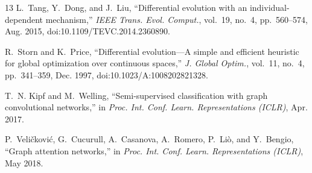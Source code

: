 \documentclass[conference]{IEEEtran}
\begin{document}
\begin{thebibliography}{13}
L.~Tang, Y.~Dong, and J.~Liu,
``Differential evolution with an individual-dependent mechanism,''
\emph{IEEE Trans. Evol. Comput.}, vol.~19, no.~4, pp.~560--574, Aug. 2015, doi:10.1109/TEVC.2014.2360890.

R.~Storn and K.~Price,
``Differential evolution---A simple and efficient heuristic for global optimization over continuous spaces,''
\emph{J. Global Optim.}, vol.~11, no.~4, pp.~341--359, Dec. 1997, doi:10.1023/A:1008202821328.

T.~N. Kipf and M.~Welling,
``Semi-supervised classification with graph convolutional networks,''
in \emph{Proc. Int. Conf. Learn. Representations (ICLR)}, Apr. 2017.

P.~Veli\v{c}kovi\'{c}, G.~Cucurull, A.~Casanova, A.~Romero, P.~Li\`{o}, and Y.~Bengio,
``Graph attention networks,''
in \emph{Proc. Int. Conf. Learn. Representations (ICLR)}, May 2018.

\end{thebibliography}
\end{document}
